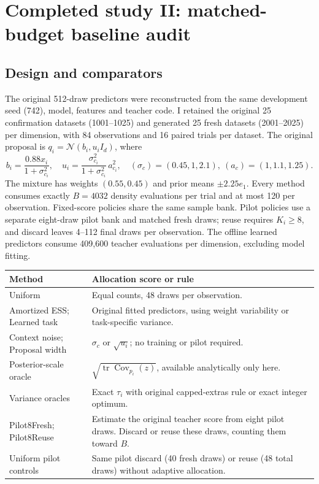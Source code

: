 \documentclass[11pt,letterpaper]{article}
\newcommand{\N}{\mathcal N}
\begin{document}
\clearpage

\section{Completed study II: matched-budget baseline audit}\label{sec:baselines}
\subsection{Design and comparators}
The original 512-draw predictors were reconstructed from the same development seed (742), model, features and teacher code. I retained the original 25 confirmation datasets (1001--1025) and generated 25 fresh datasets (2001--2025) per dimension, with 84 observations and 16 paired trials per dataset. The original proposal is $q_i=\N(b_i,u_i I_d)$, where
\begin{equation}
 b_i=\frac{0.88x_i}{1+\sigma_{c_i}^2},\quad
 u_i=\frac{\sigma_{c_i}^2}{1+\sigma_{c_i}^2}\,a_{c_i}^{2},\quad
 (\sigma_c)=(0.45,1,2.1),\ (a_c)=(1,1.1,1.25).
\end{equation}
The mixture has weights $(0.55,0.45)$ and prior means $\pm 2.25 e_1$. Every method consumes exactly $B=4032$ density evaluations per trial and at most 120 per observation. Fixed-score policies share the same sample bank. Pilot policies use a separate eight-draw pilot bank and matched fresh draws; reuse requires $K_i\geq8$, and discard leaves 4--112 final draws per observation. The offline learned predictors consume 409,600 teacher evaluations per dimension, excluding model fitting.

\begin{center}\small
\begin{tabularx}{\linewidth}{@{}lY@{}}
\toprule
Method & Allocation score or rule\\
\midrule
Uniform & Equal counts, 48 draws per observation.\\
Amortized ESS; Learned task & Original fitted predictors, using weight variability or task-specific variance.\\
Context noise; Proposal width & $\sigma_c$ or $\sqrt{u_i}$; no training or pilot required.\\
Posterior-scale oracle & $\sqrt{\operatorname{tr}\operatorname{Cov}_{p_i}(z)}$, available analytically only here.\\
Variance oracles & Exact $\tau_i$ with original capped-extras rule or exact integer optimum.\\
Pilot8Fresh; Pilot8Reuse & Estimate the original teacher score from eight pilot draws. Discard or reuse these draws, counting them toward $B$.\\
Uniform pilot controls & Same pilot discard (40 fresh draws) or reuse (48 total draws) without adaptive allocation.\\
\bottomrule
\end{tabularx}
\end{center}
\end{document}
